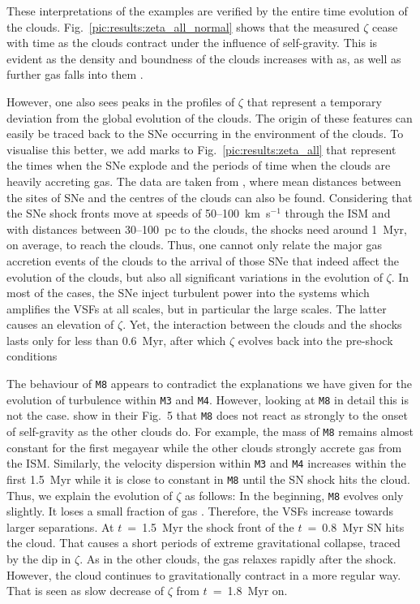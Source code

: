 These interpretations of the examples are verified by the entire time evolution of the clouds. 
Fig.~\ref{pic:results:zeta_all_normal} shows that the measured $\zeta$ cease with time as the clouds contract under the influence of self-gravity.
This is evident as the density and boundness of the clouds increases with as, as well as further gas falls into them .

However, one also sees peaks in the profiles of $\zeta$ that represent a temporary deviation from the global evolution of the clouds.
The origin of these features can easily be traced back to the SNe occurring in the environment of the clouds.
To visualise this better, we add marks to Fig.~\ref{pic:results:zeta_all} that represent the times when the SNe explode and the periods of time when the clouds are heavily accreting gas.
The data are taken from , where mean distances between the sites of SNe and the centres of the clouds can also be found.
Considering that the SNe shock fronts move at speeds of 50--100~km~s$^{-1}$ through the ISM and with distances between 30--100~pc to the clouds, the shocks need around 1~Myr, on average, to reach the clouds.
Thus, one cannot only relate the major gas accretion events of the clouds to the arrival of those SNe that indeed affect the evolution of the clouds, but also all significant variations in the evolution of $\zeta$.
In most of the cases, the SNe inject turbulent power into the systems which amplifies the VSFs at all scales, but in particular the large scales.
The latter causes an elevation of $\zeta$.
Yet, the interaction between the clouds and the shocks lasts only for less than 0.6~Myr, after which $\zeta$ evolves back into the pre-shock conditions

The behaviour of \texttt{M8} appears to contradict the explanations we have given for the evolution of turbulence within \texttt{M3} and \texttt{M4}.
However, looking at \texttt{M8} in detail this is not the case.
 show in their Fig.~5 that \texttt{M8} does not react as strongly to the onset of self-gravity as the other clouds do.
For example, the mass of \texttt{M8} remains almost constant for the first megayear while the other clouds strongly accrete gas from the ISM.
Similarly, the velocity dispersion within \texttt{M3} and \texttt{M4} increases within the first 1.5~Myr while it is close to constant in \texttt{M8} until the SN shock hits the cloud.
Thus, we explain the evolution of $\zeta$ as follows:
In the beginning, \texttt{M8} evolves only slightly.
It loses a small fraction of gas .
Therefore, the VSFs increase towards larger separations.
At $t$~=~1.5~Myr the shock front of the $t$~=~0.8~Myr SN hits the cloud.
That causes a short periods of extreme gravitational collapse, traced by the dip in $\zeta$.
As in the other clouds, the gas relaxes rapidly after the shock.
However, the cloud continues to gravitationally contract in a more regular way.
That is seen as slow decrease of $\zeta$ from $t$~=~1.8~Myr on. 

